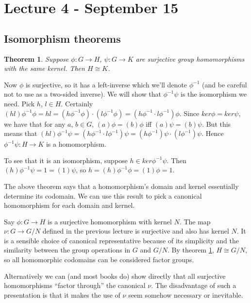 \documentclass[letter]{article}
\newtheorem{theorem}{Theorem}[section]
\newcommand{\mdot}{{\cdot}}
\newenvironment{proof}[1][Proof]{\begin{trivlist}
\item[\hskip \labelsep {\bfseries #1}]}{\end{trivlist}}
\begin{document}
\section{Lecture 4 - September 15}

\subsection{Isomorphism theorems}

\begin{theorem}
\label{firstiso}
Suppose $\phi \colon G \rightarrow H$, $\psi \colon G \rightarrow K$ are surjective group homomorphisms with the same kernel. Then $H \cong K$.
\end{theorem}
\begin{proof}
Now $\phi$ is surjective, so it has a left-inverse which we'll denote $\phi^{-1}$ (and be careful not to use as a two-sided inverse). We will show that $\phi^{-1}\psi$ is the isomorphism we need. Pick $h$, $l \in H$. Certainly $(hl)\phi^{-1}\phi = hl = (h\phi^{-1} \phi)\mdot(l\phi^{-1}\phi) = (h\phi^{-1}\mdot l\phi^{-1})\phi$. Since $ker \phi = ker \psi$, we have that for any $a$, $b \in G$, $(a)\phi = (b)\phi$ iff $(a)\psi = (b)\psi$. But this means that $(hl)\phi^{-1}\psi = (h\phi^{-1}\mdot l\phi^{-1})\psi = (h\phi^{-1})\psi\mdot (l\phi^{-1})\psi$. Hence $\phi^{-1}\psi \colon H \rightarrow K$ is a homomorphism.

To see that it is an isomorphism, suppose $h \in ker \phi^{-1}\psi$. Then $(h)\phi^{-1}\psi = 1 = (1)\psi$, so $h = (h)\phi^{-1}\phi = (1)\phi = 1$.
\end{proof}

The above theorem says that a homomorphism's domain and kernel essentially determine its codomain. We can use this result to pick a canonical homomorphism for each domain and kernel.

Say $\phi \colon G \rightarrow H$ is a surjective homomorphism with kernel $N$. The map $\nu \colon G \rightarrow G/N$ defined in the previous lecture is surjective and also has kernel $N$. It is a sensible choice of canonical representative because of its simplicity and the similarity between the group operations in $G$ and $G/N$. By theorem \ref{firstiso}, $H \cong G/N$, so all homomorphic codomains can be considered factor groups.

Alternatively we can (and most books do) show directly that all surjective homomorphisms ``factor through'' the canonical $\nu$. The disadvantage of such a presentation is that it makes the use of $\nu$ seem somehow necessary or inevitable.
\end{document}
